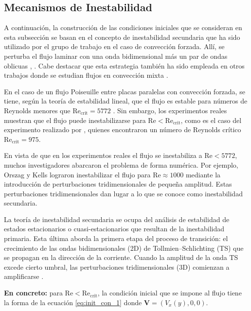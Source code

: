 \subsection{Mecanismos de Inestabilidad} \label{sec:mecanismo}

A continuación, la construcción de las condiciones iniciales que se consideran en \linebreak esta subsección se basan en el concepto de inestabilidad secundaria que ha sido utilizado por el grupo de trabajo en el caso de convección forzada. Allí, se perturba el flujo \linebreak laminar con una onda bidimensional más un par de ondas oblicuas \cite{machaca2024}, \cite{schmid}. Cabe destacar que esta estrategia también ha sido empleada en otros trabajos donde se estudian flujos en convección mixta \cite{chen2003direct}.  

En el caso de un flujo Poiseuille entre placas paralelas con convección forzada, se tiene, según la teoría de estabilidad lineal, que el flujo es estable para números de Reynolds menores que $\text{Re}_{\text{crit}}=5772$ \cite{orszag1971accurate}. Sin embargo, los experimentos reales muestran que el flujo puede inestabilizarse para $\text{Re} < \text{Re}_{\text{crit}}$, como es el caso del experimento realizado por \cite{kao1970experimental}, quienes encontraron un número de Reynolds crítico $\text{Re}_{\text{crit}}= 975$. 

En vista de que en los experimentos reales el flujo se inestabiliza a $\text{Re} < 5772$, muchos investigadores abarcaron el problema  de forma numérica. Por ejemplo, Orszag y Kells \cite{orszag1980transition} lograron inestabilizar el flujo para  $\text{Re} \approx 1000$ mediante la introducción de perturbaciones tridimensionales de pequeña amplitud. Estas perturbaciones tridimensionales dan lugar a lo que se conoce como inestabilidad secundaria.

La teoría de inestabilidad secundaria se ocupa del análisis de estabilidad de estados estacionarios o cuasi-estacionarios que resultan de la inestabilidad primaria. Esta última aborda la primera etapa del proceso de transición: el crecimiento de las ondas bidimensionales (2D) de Tollmien–Schlichting (TS) \cite{tollmien1935, schlichting1933} que se propagan en la dirección de la corriente. Cuando la amplitud de la onda TS excede cierto umbral, las perturbaciones tridimensionales (3D) comienzan a amplificarse \cite{schmid}. 

\textbf{En concreto:} para $\text{Re} < \text{Re}_{\text{crit}}$, la condición inicial que se impone al flujo tiene la forma de la ecuación \ref{eq:init_con_1} donde $\mathbf{V}=(V_x(y),0,0)$.

